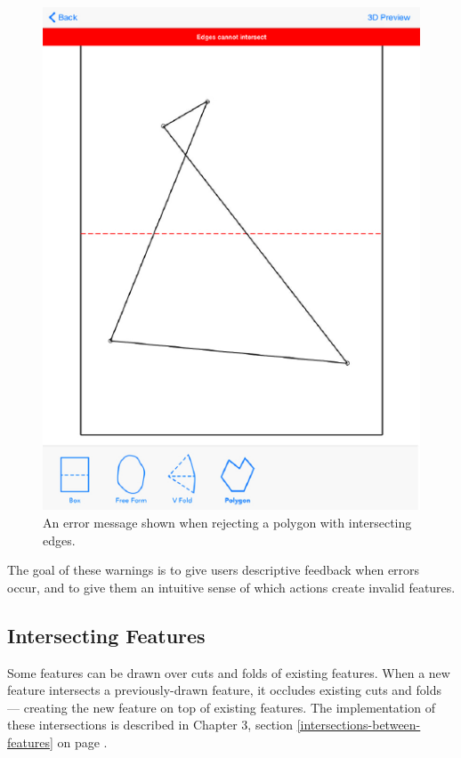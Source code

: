 \begin{figure}[htbp]
\centering
\includegraphics{figures/32_UI_Tool_Interactions/error_message.pdf}
\caption{An error message shown when rejecting a polygon with
intersecting edges.}
\end{figure}

The goal of these warnings is to give users descriptive feedback when
errors occur, and to give them an intuitive sense of which actions
create invalid features.

\subsection{Intersecting Features}\label{intersecting-features}

Some features can be drawn over cuts and folds of existing features.
When a new feature intersects a previously-drawn feature, it occludes
existing cuts and folds --- creating the new feature on top of existing
features. The implementation of these intersections is described in
Chapter 3, section \ref{intersections-between-features} on page
\pageref{intersections-between-features}.

